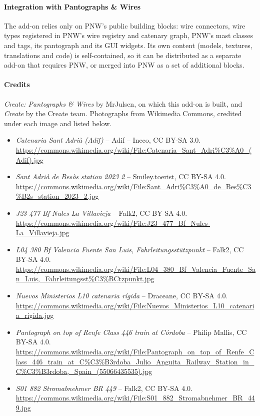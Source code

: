 \documentclass[11pt,a4paper]{article}
\begin{document}
\paragraph{Integration with Pantographs \& Wires}
The add-on relies only on PNW's public building blocks: wire connectors, wire types registered in PNW's wire
registry and catenary graph, PNW's mast classes and tags, its pantograph and its GUI widgets. Its own content
(models, textures, translations and code) is self-contained, so it can be distributed as a separate add-on that
requires PNW, or merged into PNW as a set of additional blocks.

\paragraph{Credits}
\emph{Create: Pantographs \& Wires} by MrJulsen, on which this add-on is built, and \emph{Create} by the Create
team. Photographs from Wikimedia Commons, credited under each image and listed below.

\begin{footnotesize}
\begin{itemize}
  \item \emph{Catenaria Sant Adrià (Adif)} -- Adif -- Ineco, CC BY-SA 3.0.
        \url{https://commons.wikimedia.org/wiki/File:Catenaria_Sant_Adri%C3%A0_(Adif).jpg}
  \item \emph{Sant Adrià de Besòs station 2023 2} -- Smiley.toerist, CC BY-SA 4.0.
        \url{https://commons.wikimedia.org/wiki/File:Sant_Adri%C3%A0_de_Bes%C3%B2s_station_2023_2.jpg}
  \item \emph{J23 477 Bf Nules-La Villavieja} -- Falk2, CC BY-SA 4.0.
        \url{https://commons.wikimedia.org/wiki/File:J23_477_Bf_Nules-La_Villavieja.jpg}
  \item \emph{L04 380 Bf Valencia Fuente San Luis, Fahrleitungsstützpunkt} -- Falk2, CC BY-SA 4.0.
        \url{https://commons.wikimedia.org/wiki/File:L04_380_Bf_Valencia_Fuente_San_Luis,_Fahrleitungsst%C3%BCtzpunkt.jpg}
  \item \emph{Nuevos Ministerios L10 catenaria rígida} -- Draceane, CC BY-SA 4.0.
        \url{https://commons.wikimedia.org/wiki/File:Nuevos_Ministerios_L10_catenaria_rigida.jpg}
  \item \emph{Pantograph on top of Renfe Class 446 train at Córdoba} -- Philip Mallis, CC BY-SA 4.0.
        \url{https://commons.wikimedia.org/wiki/File:Pantograph_on_top_of_Renfe_Class_446_train_at_C%C3%B3rdoba_Julio_Anguita_Railway_Station_in_C%C3%B3rdoba,_Spain_(55066435535).jpg}
  \item \emph{S01 882 Stromabnehmer BR 449} -- Falk2, CC BY-SA 4.0.
        \url{https://commons.wikimedia.org/wiki/File:S01_882_Stromabnehmer_BR_449.jpg}
\end{itemize}
\end{footnotesize}
\end{document}
